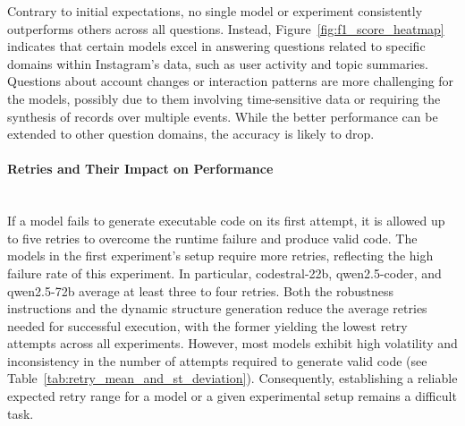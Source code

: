 \documentclass{DESSThesis}
\begin{document}
Contrary to initial expectations, no single model or experiment consistently outperforms others across all questions. Instead, Figure~\ref{fig:f1_score_heatmap} indicates that certain models excel in answering questions related to specific domains within Instagram's data, such as user activity and topic summaries. Questions about account changes or interaction patterns are more challenging for the models, possibly due to them involving time-sensitive data or requiring the synthesis of records over multiple events. While the better performance can be extended to other question domains, the accuracy is likely to drop.

\paragraph{Retries and Their Impact on Performance}\mbox{}\\

\noindent If a model fails to generate executable code on its first attempt, it is allowed up to five retries to overcome the runtime failure and produce valid code. The models in the first experiment's setup require more retries, reflecting the high failure rate of this experiment. In particular, codestral-22b, qwen2.5-coder, and qwen2.5-72b average at least three to four retries. Both the robustness instructions and the dynamic structure generation reduce the average retries needed for successful execution, with the former yielding the lowest retry attempts across all experiments. However, most models exhibit high volatility and inconsistency in the number of attempts required to generate valid code (see Table~\ref{tab:retry_mean_and_st_deviation}). Consequently, establishing a reliable expected retry range for a model or a given experimental setup remains a difficult task.
\end{document}
